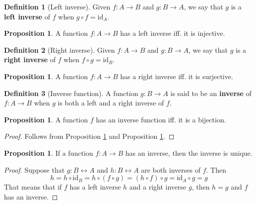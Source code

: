 \documentclass[12pt,a4paper]{article}
\theoremstyle{definition}
\newtheorem{proposition}[theorem]{Proposition}
\newtheorem{definition}{Definition}[section]
\begin{document}
\begin{definition}[Left inverse]
	Given $f : A \longrightarrow B$ and $g : B \longrightarrow A$, we say that $g$ is a \textbf{left inverse} of $f$ when $g \circ f = \text{id}_A$.
\end{definition}

\begin{proposition}\label{propleftinv}
	A function $f : A \longrightarrow B$ has a left inverse iff. it is injective.
\end{proposition}

\begin{definition}[Right inverse]
	Given $f : A \longrightarrow B$ and $g : B \longrightarrow A$, we say that $g$ is a \textbf{right inverse} of $f$ when $f \circ g = \text{id}_B$.
\end{definition}

\begin{proposition}\label{proprightinv}
	A function $f : A \longrightarrow B$ has a right inverse iff. it is surjective.
\end{proposition}

\begin{definition}[Inverse function]
	A function $g : B \longrightarrow A$ is said to be an \textbf{inverse} of $f : A \longrightarrow B$ when $g$ is both a left and a right inverse of $f$.
\end{definition}

\begin{proposition}
	A function $f$ has an inverse function iff. it is a bijection.
\end{proposition}

\begin{proof}
	Follows from Proposition \ref{propleftinv} and Proposition \ref{proprightinv}.
\end{proof}

\begin{proposition}
	If a function $f : A \longrightarrow B$ has an inverse, then the inverse is unique.
\end{proposition}

\begin{proof}
	Suppose that $g : B \longleftrightarrow A$ and $h : B \longleftrightarrow A$ are both inverses of $f$. Then
	\[ h = h \circ \text{id}_B = h \circ (f \circ g) = (h \circ f) \circ g = \text{id}_A \circ g = g \]
	That means that if $f$ has a left inverse $h$ and a right inverse $g$, then $h = g$ and $f$ has an inverse.
\end{proof}
\end{document}
